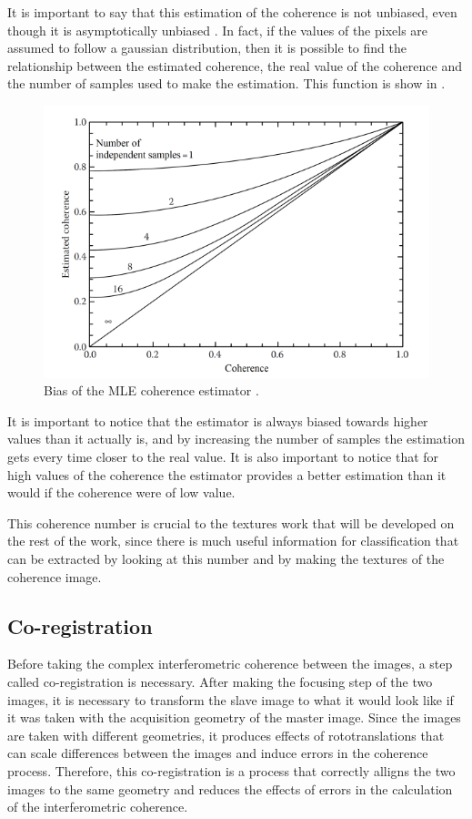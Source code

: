 It is important to say that this estimation of the coherence is not unbiased, even though it is asymptotically unbiased \cite{Bamler}. In fact, if the values of the pixels are assumed to follow a gaussian distribution, then it is possible to find the relationship between the estimated coherence, the real value of the coherence and the number of samples used to make the estimation. This function is show in .

\begin{figure}[H]
    \centering
    \includegraphics[width=\linewidth]{Cap1/bias.png}
    \caption{Bias of the MLE coherence estimator \cite{Bamler}.}
    \label{fig:bias}
\end{figure}

It is important to notice that the estimator is always biased towards higher values than it actually is, and by increasing the number of samples the estimation gets every time closer to the real value. It is also important to notice that for high values of the coherence the estimator provides a better estimation than it would if the coherence were of low value. 

This coherence number is crucial to the textures work that will be developed on the rest of the work, since there is much useful information for classification that can be extracted by looking at this number and by making the textures of the coherence image.

\subsection{Co-registration}
Before taking the complex interferometric coherence between the images, a step called co-registration is necessary. After making the focusing step of the two images, it is necessary to transform the slave image to what it would look like if it was taken with the acquisition geometry of the master image. Since the images are taken with different geometries, it produces effects of rototranslations that can scale differences between the images and induce errors in the coherence process. Therefore, this co-registration is a process that correctly alligns the two images to the same geometry and reduces the effects of errors in the calculation of the interferometric coherence\cite{andreathesis}.

